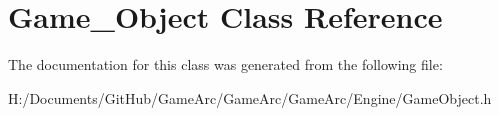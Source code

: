 \hypertarget{class_game___object}{\section{Game\+\_\+\+Object Class Reference}
\label{class_game___object}
}


The documentation for this class was generated from the following file\+:\begin{DoxyCompactItemize}
\item 
H\+:/\+Documents/\+Git\+Hub/\+Game\+Arc/\+Game\+Arc/\+Game\+Arc/\+Engine/Game\+Object.\+h\end{DoxyCompactItemize}
